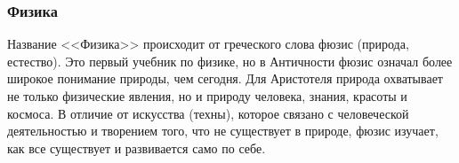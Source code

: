 \subsubsection{Физика}


Название <<Физика>> происходит от греческого слова фюзис (природа, естество). Это первый учебник по физике, но в Античности фюзис означал более широкое понимание природы, чем сегодня. Для Аристотеля природа охватывает не только физические явления, но и природу человека, знания, красоты и космоса. В отличие от искусства (техны), которое связано с человеческой деятельностью и творением того, что не существует в природе, фюзис изучает, как все существует и развивается само по себе.



